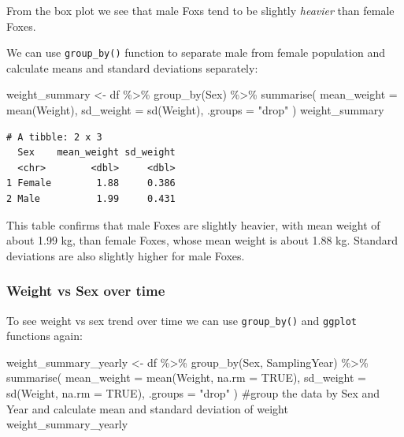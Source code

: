 \documentclass[
  letterpaper,
]{report}
\newenvironment{Shaded}{\begin{snugshade}}{\end{snugshade}}
\newcommand{\AttributeTok}[1]{\textcolor[rgb]{0.40,0.45,0.13}{#1}}
\newcommand{\CommentTok}[1]{\textcolor[rgb]{0.37,0.37,0.37}{#1}}
\newcommand{\ConstantTok}[1]{\textcolor[rgb]{0.56,0.35,0.01}{#1}}
\newcommand{\FunctionTok}[1]{\textcolor[rgb]{0.28,0.35,0.67}{#1}}
\newcommand{\NormalTok}[1]{\textcolor[rgb]{0.00,0.23,0.31}{#1}}
\newcommand{\OtherTok}[1]{\textcolor[rgb]{0.00,0.23,0.31}{#1}}
\newcommand{\SpecialCharTok}[1]{\textcolor[rgb]{0.37,0.37,0.37}{#1}}
\newcommand{\StringTok}[1]{\textcolor[rgb]{0.13,0.47,0.30}{#1}}
\begin{document}
From the box plot we see that male Foxs tend to be slightly
\emph{heavier} than female Foxes.

We can use \texttt{group\_by()} function to separate male from female
population and calculate means and standard deviations separately:

\begin{Shaded}
\begin{Highlighting}[]
\NormalTok{weight\_summary }\OtherTok{\textless{}{-}}\NormalTok{ df }\SpecialCharTok{\%\textgreater{}\%}
  \FunctionTok{group\_by}\NormalTok{(Sex) }\SpecialCharTok{\%\textgreater{}\%}
  \FunctionTok{summarise}\NormalTok{(}
    \AttributeTok{mean\_weight =} \FunctionTok{mean}\NormalTok{(Weight),}
    \AttributeTok{sd\_weight =} \FunctionTok{sd}\NormalTok{(Weight),}
    \AttributeTok{.groups =} \StringTok{"drop"}
\NormalTok{  )}
\NormalTok{weight\_summary}
\end{Highlighting}
\end{Shaded}

\begin{verbatim}
# A tibble: 2 x 3
  Sex    mean_weight sd_weight
  <chr>        <dbl>     <dbl>
1 Female        1.88     0.386
2 Male          1.99     0.431
\end{verbatim}

This table confirms that male Foxes are slightly heavier, with mean
weight of about 1.99 kg, than female Foxes, whose mean weight is about
1.88 kg. Standard deviations are also slightly higher for male Foxes.

\subsubsection{Weight vs Sex over time}\label{weight-vs-sex-over-time}

To see weight vs sex trend over time we can use \texttt{group\_by()} and
\texttt{ggplot} functions again:

\begin{Shaded}
\begin{Highlighting}[]
\NormalTok{weight\_summary\_yearly }\OtherTok{\textless{}{-}}\NormalTok{ df }\SpecialCharTok{\%\textgreater{}\%}
  \FunctionTok{group\_by}\NormalTok{(Sex, SamplingYear) }\SpecialCharTok{\%\textgreater{}\%}
  \FunctionTok{summarise}\NormalTok{(}
    \AttributeTok{mean\_weight =} \FunctionTok{mean}\NormalTok{(Weight, }\AttributeTok{na.rm =} \ConstantTok{TRUE}\NormalTok{),}
    \AttributeTok{sd\_weight =} \FunctionTok{sd}\NormalTok{(Weight, }\AttributeTok{na.rm =} \ConstantTok{TRUE}\NormalTok{),}
    \AttributeTok{.groups =} \StringTok{"drop"}
\NormalTok{  ) }\CommentTok{\#group the data by Sex and Year and calculate mean and standard deviation of weight}
\NormalTok{weight\_summary\_yearly}
\end{Highlighting}
\end{Shaded}
\end{document}
